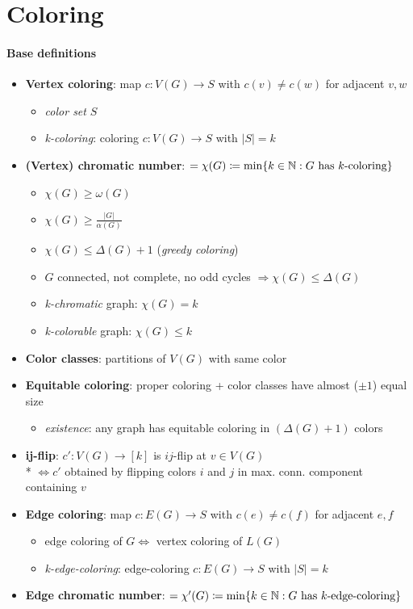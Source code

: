 \section{Coloring}

\paragraph{Base definitions}
\begin{itemize}
  \item \textbf{Vertex coloring}: map $ c: V(G) \to S $ with $ c(v) \neq c(w) $ for adjacent $ v,w $
  \begin{itemize}
    \item \emph{color set} $ S $
    \item \emph{k-coloring}: coloring $ c: V(G) \to S $ with $ \vert S \vert = k $
  \end{itemize}
  \item \textbf{(Vertex) chromatic number}: $ = \chi(G) \coloneqq \min\{ k \in \mathbb{N} : G \text{ has $ k $-coloring} \} $
  \begin{itemize}
    \item $ \chi(G) \geq \omega(G) $ 
    \item $ \chi(G) \geq \frac{\vert G \vert}{\alpha(G)} $
    \item $ \chi(G) \leq \Delta(G) + 1 $ (\emph{greedy coloring})
    \item $ G $ connected, not complete, no odd cycles $ \Rightarrow \chi(G) \leq \Delta(G) $
    \item \emph{k-chromatic} graph: $ \chi(G) = k $ 
    \item \emph{k-colorable} graph: $ \chi(G) \leq k $ 
  \end{itemize}
  \item \textbf{Color classes}: partitions of $ V(G) $ with same color
  \item \textbf{Equitable coloring}: proper coloring + color classes have almost ($ \pm 1 $) equal size
  \begin{itemize}
    \item \emph{existence}: any graph has equitable coloring in $ (\Delta(G) + 1) $ colors 
  \end{itemize}
  \item \textbf{ij-flip}: $ c': V(G) \to [k] $ is $ ij $-flip at $ v \in V(G) $ \\*
    $ \Leftrightarrow c' $ obtained by flipping colors $ i $ and $ j $ in max. conn. component containing $ v $
  \item \textbf{Edge coloring}: map $ c: E(G) \to S $ with $ c(e) \neq c(f) $ for adjacent $ e,f $
  \begin{itemize}
    \item edge coloring of $ G  \Leftrightarrow $ vertex coloring of $ L(G) $
    \item \emph{k-edge-coloring}: edge-coloring $ c: E(G) \to S $ with $ \vert S \vert = k $
  \end{itemize}
  \item \textbf{Edge chromatic number}: $ = \chi'(G) \coloneqq \min\{ k \in \mathbb{N} : G \text{ has $ k $-edge-coloring} \} $
\end{itemize}

